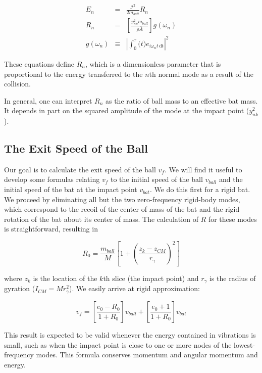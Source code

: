 \documentclass[12pt]{article}
\newcommand{\dd}{\ensuremath{\,\mathrm{d}}}
\begin{document}
\begin{eqnarray}
E_n&=&\frac{\mathcal{I}^2}{2m_{ball}}R_n \nonumber \\
R_n&=&[\frac{y^2_{nk}m_{ball}}{\rho \bar{A}}]g(\omega_n) \\
g(\omega_n)&\equiv&|\int^\tau_0\mathcal(t)e_{i\omega_n t\dd t}|^2
\end{eqnarray}

These equations define $R_n$, which is a dimensionless parameter that is proportional to the energy transferred to the $n$th normal mode as a result of the collision.

In general, one can interpret $R_n$ as the ratio of ball mass to an effective bat mass. It depends in part on the squared amplitude of the mode at the impact point ($y_{nk}^2$).

\subsection{The Exit Speed of the Ball}

Our goal is to calculate the exit speed of the ball $v_f$.
We will find it useful to develop
some formulas relating $v_f$ to the initial speed of the
ball $v_{ball}$ and the initial speed of the bat at the impact point $v_{bat}$.
We do this first for a rigid bat. We proceed by eliminating all but the two
zero-frequency rigid-body modes, which correspond to the
recoil of the center of mass of the bat and the rigid rotation
of the bat about its center of mass. The calculation of $R$ for
these modes is straightforward, resulting in

\begin{equation}
R_0=\frac{m_{ball}}{M}[1+(\frac{z_k-z_{CM}}{r_\gamma})^2]
\end{equation}

where $z_k$ is the location of the $k$th slice (the impact point)
and $r_\gamma$ is the radius of gyration
($I_{CM}=Mr^2_\gamma$). We easily arrive
at rigid approximation:


\begin{equation}
v_f=[\frac{e_0-R_0}{1+R_0}]v_{ball}+[\frac{e_0+1}{1+R_0}]v_{bat}
\end{equation}

This result is expected to be valid whenever the energy contained in vibrations is small, such as when the impact point is
close to one or more nodes of the lowest-frequency modes. This formula conserves momentum and angular momentum and energy.
\end{document}
